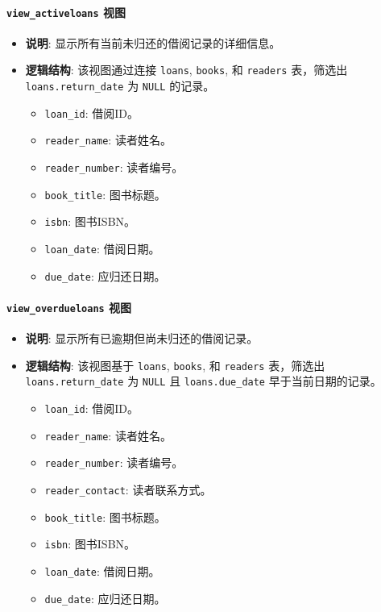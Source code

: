 \documentclass[11pt, a4paper]{article}
\begin{document}
\paragraph{\texttt{view\_activeloans} 视图}
\begin{itemize}
    \item \textbf{说明}: 显示所有当前未归还的借阅记录的详细信息。
    \item \textbf{逻辑结构}: 该视图通过连接 \texttt{loans}, \texttt{books}, 和 \texttt{readers} 表，筛选出 \texttt{loans.return\_date} 为 \texttt{NULL} 的记录。
    \begin{itemize}
        \item \texttt{loan\_id}: 借阅ID。
        \item \texttt{reader\_name}: 读者姓名。
        \item \texttt{reader\_number}: 读者编号。
        \item \texttt{book\_title}: 图书标题。
        \item \texttt{isbn}: 图书ISBN。
        \item \texttt{loan\_date}: 借阅日期。
        \item \texttt{due\_date}: 应归还日期。
    \end{itemize}
\end{itemize}

\paragraph{\texttt{view\_overdueloans} 视图}
\begin{itemize}
    \item \textbf{说明}: 显示所有已逾期但尚未归还的借阅记录。
    \item \textbf{逻辑结构}: 该视图基于 \texttt{loans}, \texttt{books}, 和 \texttt{readers} 表，筛选出 \texttt{loans.return\_date} 为 \texttt{NULL} 且 \texttt{loans.due\_date} 早于当前日期的记录。
    \begin{itemize}
        \item \texttt{loan\_id}: 借阅ID。
        \item \texttt{reader\_name}: 读者姓名。
        \item \texttt{reader\_number}: 读者编号。
        \item \texttt{reader\_contact}: 读者联系方式。
        \item \texttt{book\_title}: 图书标题。
        \item \texttt{isbn}: 图书ISBN。
        \item \texttt{loan\_date}: 借阅日期。
        \item \texttt{due\_date}: 应归还日期。
    \end{itemize}
\end{itemize}
\end{document}
